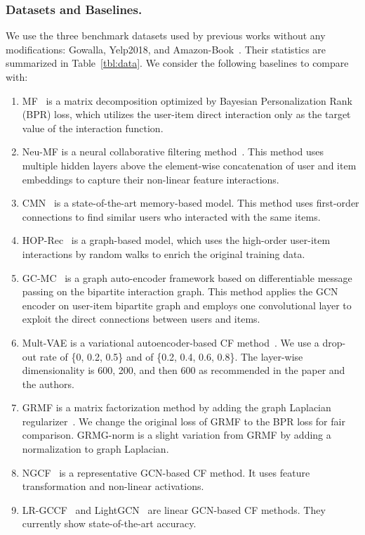 \documentclass[sigconf]{acmart}
\begin{document}
\subsubsection{Datasets and Baselines.} We use the three benchmark datasets used by previous works without any modifications: Gowalla, Yelp2018, and Amazon-Book~\cite{10.1145/3331184.3331267,Chen_Wu_Hong_Zhang_Wang_2020,10.1145/3397271.3401063}. Their statistics are summarized in Table~\ref{tbl:data}. We consider the following baselines to compare with:
\begin{enumerate}
    \item MF~\cite{10.5555/1795114.1795167} is a matrix decomposition optimized by Bayesian Personalization Rank (BPR) loss, which utilizes the user-item direct interaction only as the target value of the interaction function.
    \item Neu-MF is a neural collaborative filtering method~\cite{He2017}. This method uses multiple hidden layers above the element-wise concatenation of user and item embeddings to capture their non-linear feature interactions.
    \item CMN~\cite{Ebesu2018} is a state-of-the-art memory-based model. This method uses first-order connections to find similar users who interacted with the same items.
    \item HOP-Rec~\cite{yang2018hop} is a graph-based model, which uses the high-order user-item interactions by random walks to enrich the original training data.
    \item GC-MC~\cite{DBLP:journals/corr/BergKW17} is a graph auto-encoder framework based on differentiable message passing on the bipartite interaction graph. This method applies the GCN encoder on user-item bipartite graph and employs one convolutional layer to exploit the direct connections between users and items.
    \item Mult-VAE is a variational autoencoder-based CF method~\cite{10.1145/3178876.3186150}. We use a drop-out rate of \{0, 0.2, 0.5\} and  of \{0.2, 0.4, 0.6, 0.8\}. The layer-wise dimensionality is 600, 200, and then 600 as recommended in the paper and the authors.
    \item GRMF is a matrix factorization method by adding the graph Laplacian regularizer~\cite{NIPS2015_f4573fc7}. We change the original loss of GRMF to the BPR loss for fair comparison. GRMG-norm is a slight variation from GRMF by adding a normalization to graph Laplacian.
    \item NGCF~\cite{10.1145/3331184.3331267} is a representative GCN-based CF method. It uses feature transformation and non-linear activations.
    \item LR-GCCF~\cite{Chen_Wu_Hong_Zhang_Wang_2020} and LightGCN~\cite{10.1145/3397271.3401063} are linear GCN-based CF methods. They currently show state-of-the-art accuracy.
\end{enumerate}
\end{document}
